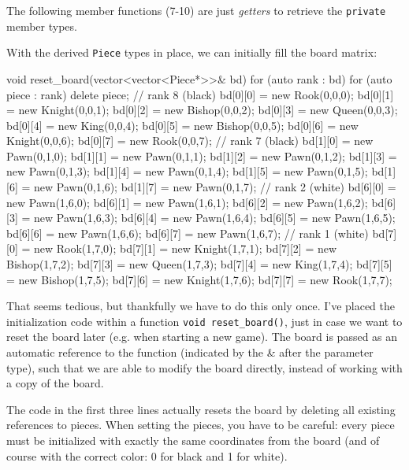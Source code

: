The following member functions (7-10) are just \emph{getters} to retrieve the
\texttt{private} member types.

With the derived \texttt{Piece} types in place, we can initially fill the board matrix:

\begin{cpp}
void reset_board(vector<vector<Piece*>>& bd) {
  for (auto rank : bd) {
    for (auto piece : rank) {
      delete piece;
    }
  }
  // rank 8 (black)
  bd[0][0] = new Rook(0,0,0);
  bd[0][1] = new Knight(0,0,1);
  bd[0][2] = new Bishop(0,0,2);
  bd[0][3] = new Queen(0,0,3);
  bd[0][4] = new King(0,0,4);
  bd[0][5] = new Bishop(0,0,5);
  bd[0][6] = new Knight(0,0,6);
  bd[0][7] = new Rook(0,0,7);
  // rank 7 (black)
  bd[1][0] = new Pawn(0,1,0);
  bd[1][1] = new Pawn(0,1,1);
  bd[1][2] = new Pawn(0,1,2);
  bd[1][3] = new Pawn(0,1,3);
  bd[1][4] = new Pawn(0,1,4);
  bd[1][5] = new Pawn(0,1,5);
  bd[1][6] = new Pawn(0,1,6);
  bd[1][7] = new Pawn(0,1,7);
  // rank 2 (white)
  bd[6][0] = new Pawn(1,6,0);
  bd[6][1] = new Pawn(1,6,1);
  bd[6][2] = new Pawn(1,6,2);
  bd[6][3] = new Pawn(1,6,3);
  bd[6][4] = new Pawn(1,6,4);
  bd[6][5] = new Pawn(1,6,5);
  bd[6][6] = new Pawn(1,6,6);
  bd[6][7] = new Pawn(1,6,7);
  // rank 1 (white)
  bd[7][0] = new Rook(1,7,0);
  bd[7][1] = new Knight(1,7,1);
  bd[7][2] = new Bishop(1,7,2);
  bd[7][3] = new Queen(1,7,3);
  bd[7][4] = new King(1,7,4);
  bd[7][5] = new Bishop(1,7,5);
  bd[7][6] = new Knight(1,7,6);
  bd[7][7] = new Rook(1,7,7);
}
\end{cpp}

That seems tedious, but thankfully we have to do this only once.
I've placed the initialization code within a function \texttt{void reset_board()},
just in case we want to reset the board later (e.g. when starting a new game).
The board is passed as an automatic reference to the function (indicated by the \& after the
parameter type), such that we are able to modify the board directly,
instead of working with a copy of the board.

The code in the first three lines actually resets the board by deleting all existing
references to pieces.
When setting the pieces, you have to be careful: every piece must be initialized with exactly the
same coordinates from the board (and of course with the correct color: 0 for black and 1 for white).

